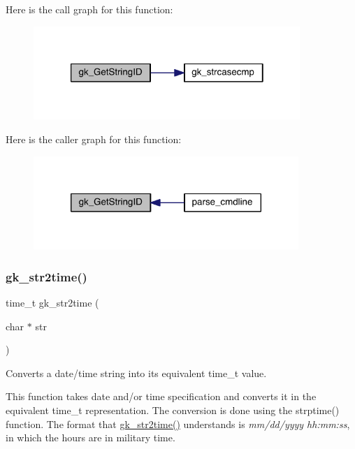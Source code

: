 Here is the call graph for this function\+:\nopagebreak
\begin{figure}[H]
\begin{center}
\leavevmode
\includegraphics[width=286pt]{a00143_acd02cb328067e37baaeff8c7d887dc10_cgraph}
\end{center}
\end{figure}
Here is the caller graph for this function\+:\nopagebreak
\begin{figure}[H]
\begin{center}
\leavevmode
\includegraphics[width=284pt]{a00143_acd02cb328067e37baaeff8c7d887dc10_icgraph}
\end{center}
\end{figure}
\mbox{\label{a00143_a5973a9945423f69a60d3b209082fd718}} 
\subsubsection{\texorpdfstring{gk\+\_\+str2time()}{gk\_str2time()}}
{\footnotesize\ttfamily time\+\_\+t gk\+\_\+str2time (\begin{DoxyParamCaption}\item[{char $\ast$}]{str }\end{DoxyParamCaption})}



Converts a date/time string into its equivalent time\+\_\+t value. 

This function takes date and/or time specification and converts it in the equivalent time\+\_\+t representation. The conversion is done using the strptime() function. The format that \hyperlink{a00143_a5973a9945423f69a60d3b209082fd718}{gk\+\_\+str2time()} understands is {\itshape mm/dd/yyyy hh\+:mm\+:ss}, in which the hours are in military time.


